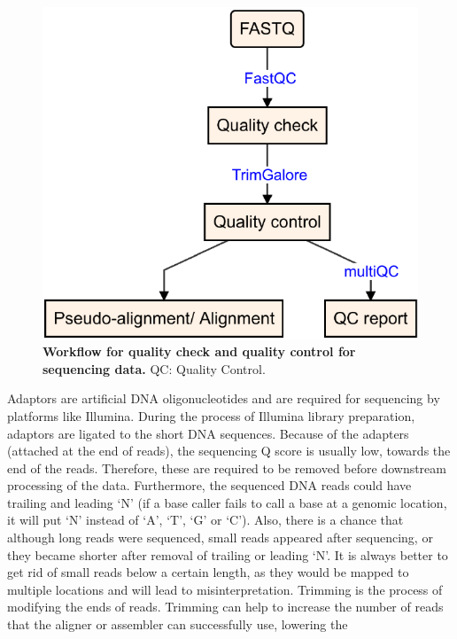 \documentclass[12pt,twoside]{reedthesis}
\begin{document}
\begin{figure}[H]

{\centering \includegraphics{thesis_files/figure-latex/mf3-1} 

}

\caption[Workflow for quality check and quality control for sequencing data]{\textbf{Workflow for quality check and quality control for sequencing data.} QC: Quality Control.}\label{fig:mf3}
\end{figure}
Adaptors are artificial DNA oligonucleotides and are required for
sequencing by platforms like Illumina. During the process of Illumina
library preparation, adaptors are ligated to the short DNA sequences.
Because of the adapters (attached at the end of reads), the sequencing Q
score is usually low, towards the end of the reads. Therefore, these are required to be removed before
downstream processing of the data. Furthermore, the sequenced DNA reads
could have trailing and leading `N' (if a base caller fails to call a
base at a genomic location, it will put `N' instead of `A', `T', `G' or
`C'). Also, there is a chance that although long reads were sequenced,
small reads appeared after sequencing, or they became shorter after
removal of trailing or leading `N'. It is always better to get rid of
small reads below a certain length, as they would be mapped to multiple
locations and will lead to misinterpretation. Trimming is the process of
modifying the ends of reads. Trimming can help to increase the number of
reads that the aligner or assembler can successfully use, lowering the
\end{document}
